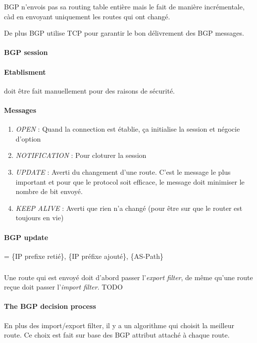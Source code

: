 BGP n'envois pas sa routing table entière mais le fait de manière incrémentale, càd en
envoyant uniquement les routes qui ont changé.

De plus BGP utilise TCP pour garantir le bon délivrement des BGP messages.

\paragraph{BGP session}

\paragraph{Etablisment} doit être fait manuellement pour des raisons de sécurité.

\paragraph{Messages}

\begin{enumerate}
    \item \textit{OPEN} : Quand la connection est établie, ça initialise la session et
        négocie d'option
    \item \textit{NOTIFICATION} : Pour cloturer la session
    \item \textit{UPDATE} : Averti du changement d'une route. C'est le message le plus important et pour que le protocol soit efficace, le message doit minimiser le nombre de bit envoyé.
    \item \textit{KEEP ALIVE} : Averti que rien n'a changé (pour être sur que le router
        est toujours en vie)
\end{enumerate}

\paragraph{BGP update} = \{IP prefixe retié\}, \{IP préfixe ajouté\}, \{AS-Path\}

\subparagraph{ } Une route qui est envoyé doit d'abord passer l'\textit{export filter},
de même qu'une route reçue doit passer l'\textit{import filter}.
TODO

\paragraph{The BGP decision process}
En plus des import/export filter, il y a un algorithme qui choisit la meilleur route.
Ce choix est fait sur base des BGP attribut attaché à chaque route.

